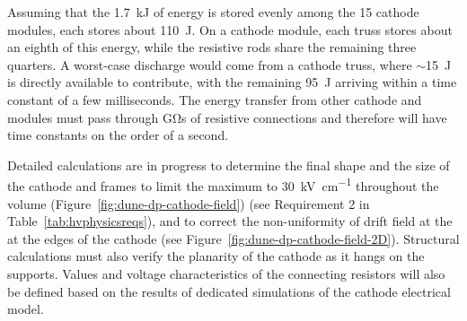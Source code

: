 Assuming that the \SI{1.7}{\kilo\joule} of energy is stored evenly among the \num{15} cathode modules, each stores about \SI{110}{\joule}.  On a cathode module, each truss stores about an eighth of this energy, while the resistive rods share the remaining three quarters.  A worst-case discharge would come from a cathode truss, where $\sim$\SI{15}{\joule} is directly available to contribute, with the remaining \SI{95}{\joule} arriving within a time constant of a few milliseconds.  The energy transfer from other cathode and  modules must pass through \si{\giga\ohm}s of resistive connections and therefore will have time constants on the order of a second.


Detailed calculations are in progress to determine the final shape and the size of the cathode and  frames to %
limit the maximum \efield to \SI{30}{\kV\per\cm}  
throughout the  volume (Figure~\ref{fig:dune-dp-cathode-field}) (see Requirement 2 in Table~\ref{tab:hvphysicsreqs}), and to correct the non-uniformity of drift field at the at the edges of the cathode (see Figure~\ref{fig:dune-dp-cathode-field-2D}).  Structural calculations must also verify the planarity of the cathode as it hangs on the  supports.
Values and voltage characteristics of the connecting resistors will also be defined based on the results of dedicated simulations of the cathode electrical model.


